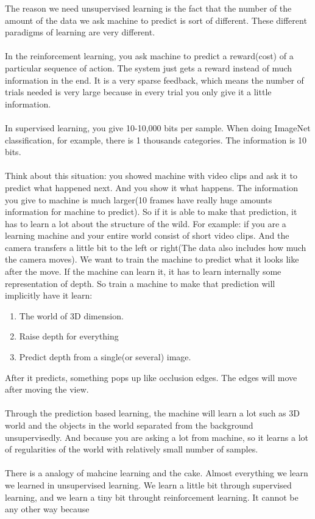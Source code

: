 \documentclass{article}
\begin{document}
The reason we need unsupervised learning is the fact that the number of the amount of the data we ask machine to predict is sort of different. These different paradigms of learning are very different. \\ \\

In the reinforcement learning, you ask machine to predict a reward(cost) of a particular sequence of action. The system just gets a reward instead of much information in the end. 
It is a very sparse feedback, which means the number of trials needed is very large because in every trial you only give it a little information. \\ \\

In supervised learning, you give 10-10,000 bits per sample. When doing ImageNet classification, for example, there is 1 thousands categories. The information is 10 bits. \\ \\

Think about this situation: you showed machine with video clips and ask it to predict what happened next. And you show it what happens. The information you give to machine is much larger(10 frames have really huge amounts information for machine to predict). So if it is able to make that prediction, it has to learn a lot about the structure of the wild. For example: if you are a learning machine and your entire world consist of short video clips. And the camera transfers a little bit to the left or right(The data also includes how much the camera moves). We want to train the machine to predict what it looks like after the move. If the machine can learn it, it has to learn internally some representation of depth. So train a machine to make that prediction will implicitly have it learn: 
\begin{enumerate}
    \item The world of 3D dimension. 
    \item Raise depth for everything
    \item Predict depth from a single(or several) image.
\end{enumerate} 
After it predicts, something pops up like occlusion edges. The edges will move after moving the view.\\ \\

Through the prediction based learning, the machine will learn a lot such as 3D world and the objects in the world separated from the background unsupervisedly. And because you are asking a lot from machine, so it learns a lot of regularities of the world with relatively small number of samples. \\ \\

There is a analogy of mahcine learning and the cake. Almost everything we learn we learned in unsupervised learning. We learn a little bit through supervised learning, and we learn a tiny bit throught reinforcement learning. It cannot be any other way because 
\end{document}
